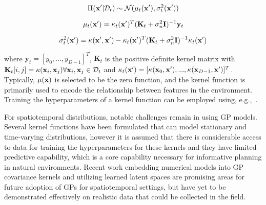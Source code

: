 \begin{equation}
    \Pi(\mathbf{x}' | \mathcal{D}_t) \sim \mathcal{N}(\mu_t(\mathbf{x}'),\sigma_t^2(\mathbf{x}'))
\end{equation}

\begin{equation}
    \mu_t(\mathbf{x}') = \kappa_t(\mathbf{x}')^T(\mathbf{K}_t + \sigma_n^2\mathbf{I})^{-1}\mathbf{y}_t
\end{equation}

\begin{equation}
    \sigma_t^2(\mathbf{x}') = \kappa(\mathbf{x}',\mathbf{x}') - \kappa_t(\mathbf{x}')^T(\mathbf{K}_t + \sigma_n^2 \mathbf{I})^{-1}\kappa_t(\mathbf{x}')
\end{equation}

\noindent where $\mathbf{y}_t = [y_0,...,y_{D-1}]^T$, $\mathbf{K}_t$ is the positive definite kernel matrix with $\mathbf{K}_t[i,j] = \kappa(\mathbf{x}_i,\mathbf{x}_j) \forall \mathbf{x}_i,\mathbf{x}_j \in \mathcal{D}_t$ and $\kappa_t(\mathbf{x}') = [\kappa(\mathbf{x}_0,\mathbf{x}'), ..., \kappa(\mathbf{x}_{D-1},\mathbf{x}')]^T$. Typically, $\mu(\mathbf{x})$ is selected to be the zero function, and the kernel function is primarily used to encode the relationship between features in the environment. Training the hyperparameters of a kernel function can be employed using, e.g.,~\cite{bergstra2011algorithms}.

For spatiotemporal distributions, notable challenges remain in using GP models. Several kernel functions have been formulated that can model stationary and time-varying distributions\autocite{singh2010modeling, garg2012learning, chen2022ak, raissi2018numerical}, however it is assumed that there is considerable access to data for training the hyperparameters for these kernels and they have limited predictive capability, which is a core capability necessary for informative planning in natural environments. Recent work embedding numerical models into GP covariance kernels\autocite{raissi2018numerical} and utilizing learned latent spaces\autocite{wilson2016deep,al2017learning,wilson2016stochastic,sun2018differentiable,wang2022physics,wan2017reduced,you2017deep,whitman2017learning,kingravi2016kernel} are promising areas for future adoption of GPs for spatiotemporal settings, but have yet to be demonstrated effectively on realistic data that could be collected in the field\autocite{ober2021promises}.


